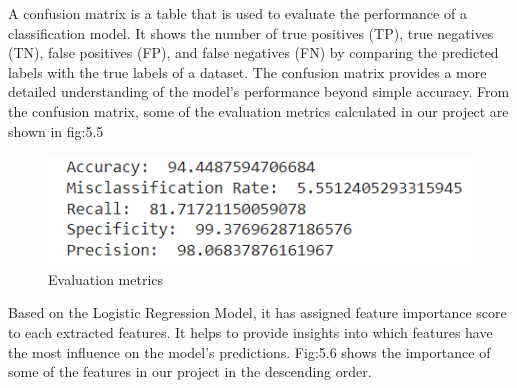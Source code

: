 \par A confusion matrix is a table that is used to evaluate the performance of a classification model. It shows the number of true positives (TP), true negatives (TN), false positives (FP), and false negatives (FN) by comparing the predicted labels with the true labels of a dataset. The confusion matrix provides a more detailed understanding of the model's performance beyond simple accuracy. From the confusion matrix, some of the evaluation metrics calculated in our project are shown in fig:5.5
\begin{figure}[H]
\centerline{\includegraphics[scale=0.8]{CMvalues.png}}
\caption{Evaluation metrics}
\label{fig}
\end{figure}
\par Based on the Logistic Regression Model, it has assigned feature importance score to each extracted features. It helps to provide insights into which features have the most influence on the model's predictions. Fig:5.6 shows the importance of some of the features in our project in the descending order.
